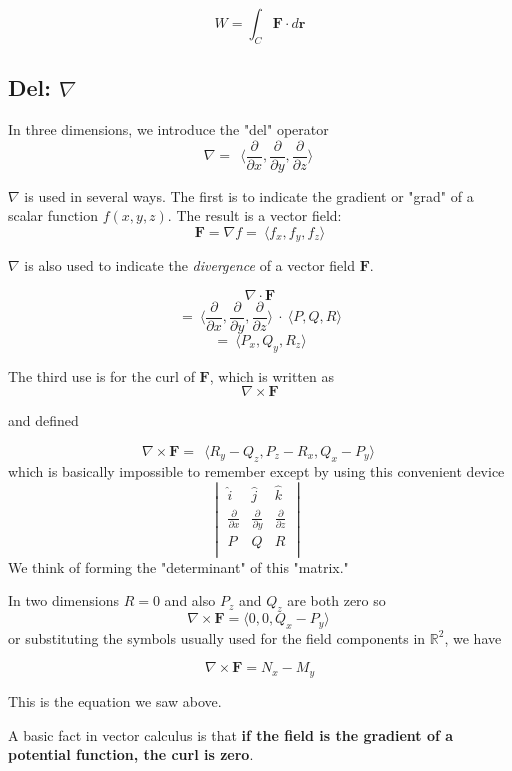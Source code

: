 \documentclass[11pt, oneside]{article}
\begin{document}
\[ W = \int_C \mathbf{F} \cdot d\mathbf{r}  \]

\subsection*{Del:  $\nabla$}

In three dimensions, we introduce the "del" operator
\[ \nabla = \ \ \langle \frac{\partial}{\partial x},\frac{\partial}{\partial y},\frac{\partial}{\partial z}  \rangle \  \]

$\nabla$ is used in several ways.  The first is to indicate the gradient or "grad" of a scalar function $f(x,y,z)$.  The result is a vector field:
\[ \mathbf{F} = \nabla f = \ \langle f_x, f_y, f_z \rangle \]

$\nabla$ is also used to indicate the \emph{divergence} of a vector field $\mathbf{F}$.  

\[ \nabla \cdot \mathbf{F} \]
\[ = \ \langle \frac{\partial}{\partial x},\frac{\partial}{\partial y},\frac{\partial}{\partial z}  \rangle \ \cdot \ \langle P, Q, R \rangle \]
\[ =  \ \langle P_x, Q_y, R_z \rangle \]

The third use is for the curl of $\mathbf{F}$, which is written as
\[ \nabla \times \mathbf{F} \]

and defined 

\[ \nabla \times \mathbf{F} =  \ \ \langle R_y-Q_z,P_z-R_x,Q_x-P_y \rangle \  \]
which is basically impossible to remember except by using this convenient device
\[
\begin{vmatrix} 
  \hat{i}  &  \hat{j} & \hat{k} \\ 
  \frac{\partial}{\partial x}  &  \frac{\partial}{\partial y} & \frac{\partial}{\partial z} \\ 
  P  & Q & R \\ 
\end{vmatrix} \ \
\]
We think of forming the "determinant" of this "matrix."

In two dimensions $R=0$ and also $P_z$ and $Q_z$ are both zero so
\[ \nabla \times \mathbf{F} = \langle 0,0,Q_x-P_y \rangle \  \]
or substituting the symbols usually used for the field components in $\mathbb{R}^2$, we have

\[ \nabla \times \mathbf{F} = N_x - M_y \]

This is the equation we saw above.

A basic fact in vector calculus is that \textbf{if the field is the gradient of a potential function, the curl is zero}.  
\end{document}
